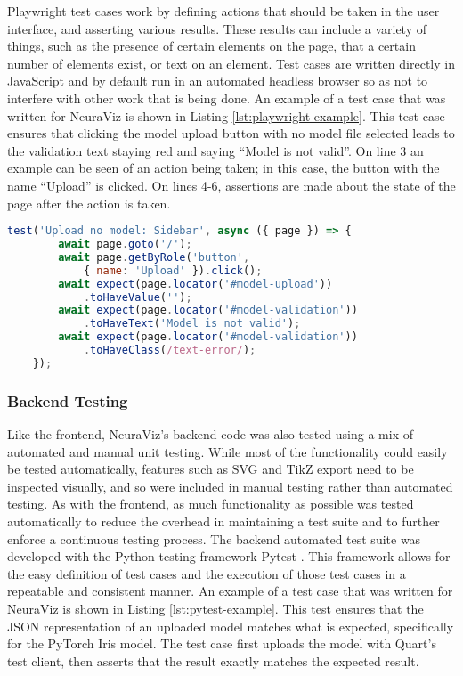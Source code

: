 Playwright test cases work by defining actions that should be taken in the user interface, and asserting various results. These results can include a variety of things, such as the presence of certain elements on the page, that a certain number of elements exist, or text on an element. Test cases are written directly in JavaScript and by default run in an automated headless browser so as not to interfere with other work that is being done. An example of a test case that was written for NeuraViz is shown in Listing \ref{lst:playwright-example}. This test case ensures that clicking the model upload button with no model file selected leads to the validation text staying red and saying ``Model is not valid''. On line 3 an example can be seen of an action being taken; in this case, the button with the name ``Upload'' is clicked. On lines 4-6, assertions are made about the state of the page after the action is taken.

\begin{center}
    \begin{lstlisting}[language=JavaScript, float=*htb, caption={Playwright Test Case Example}, label={lst:playwright-example}]
    test('Upload no model: Sidebar', async ({ page }) => {
        await page.goto('/');
        await page.getByRole('button', 
            { name: 'Upload' }).click();
        await expect(page.locator('#model-upload'))
            .toHaveValue('');
        await expect(page.locator('#model-validation'))
            .toHaveText('Model is not valid');
        await expect(page.locator('#model-validation'))
            .toHaveClass(/text-error/);
    });
    \end{lstlisting}
\end{center}

\subsubsection{Backend Testing}
Like the frontend, NeuraViz's backend code was also tested using a mix of automated and manual unit testing. While most of the functionality could easily be tested automatically, features such as SVG and TikZ export need to be inspected visually, and so were included in manual testing rather than automated testing. As with the frontend, as much functionality as possible was tested automatically to reduce the overhead in maintaining a test suite and to further enforce a continuous testing process. The backend automated test suite was developed with the Python testing framework Pytest \cite{pytest}. This framework allows for the easy definition of test cases and the execution of those test cases in a repeatable and consistent manner. An example of a test case that was written for NeuraViz is shown in Listing \ref{lst:pytest-example}. This test ensures that the JSON representation of an uploaded model matches what is expected, specifically for the PyTorch Iris model. The test case first uploads the model with Quart's test client, then asserts that the result exactly matches the expected result.

